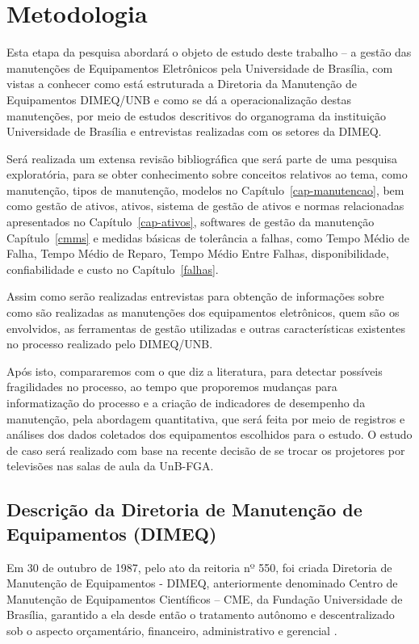 %

\chapter{Metodologia}

Esta etapa da pesquisa abordará o objeto de estudo deste trabalho – a gestão das manutenções de Equipamentos Eletrônicos pela Universidade de Brasília, com vistas a conhecer como está estruturada a Diretoria da Manutenção de Equipamentos DIMEQ/UNB e como se dá a operacionalização destas manutenções, por meio de estudos descritivos do organograma da instituição Universidade de Brasília e entrevistas realizadas com os setores da DIMEQ.

Será realizada um extensa revisão bibliográfica que será parte de uma pesquisa exploratória, para se obter conhecimento sobre conceitos relativos ao tema, como manutenção, tipos de manutenção, modelos no Capítulo~\ref{cap-manutencao}, bem como gestão de ativos, ativos, sistema de gestão de ativos e normas relacionadas apresentados no Capítulo~\ref{cap-ativos}, softwares de gestão da manutenção Capítulo~\ref{cmms} e medidas básicas de tolerância a falhas, como  Tempo Médio de Falha, Tempo Médio de Reparo, Tempo Médio Entre Falhas, disponibilidade, confiabilidade e custo no Capítulo~\ref{falhas}.

Assim como serão realizadas entrevistas para obtenção de informações sobre como são realizadas as manutenções dos equipamentos eletrônicos, quem são os envolvidos, as ferramentas de gestão utilizadas e outras características existentes no processo realizado pelo DIMEQ/UNB.

Após isto, compararemos com o que diz a literatura, para detectar possíveis fragilidades no processo, ao tempo que proporemos mudanças para informatização do processo e a criação de indicadores de desempenho da manutenção, pela abordagem quantitativa, que será feita por meio de registros e análises dos dados coletados dos equipamentos escolhidos para o estudo. O estudo de caso será realizado com base na recente decisão de se trocar os projetores por televisões nas salas de aula da UnB-FGA. 

\section{Descrição da Diretoria de Manutenção de Equipamentos (DIMEQ)}

Em 30 de outubro de 1987, pelo ato da reitoria nº 550, foi criada Diretoria de Manutenção de Equipamentos - DIMEQ, anteriormente denominado Centro de Manutenção de Equipamentos Científicos – CME, da Fundação Universidade de Brasília, garantido a ela desde então o tratamento autônomo e descentralizado sob o aspecto orçamentário, financeiro, administrativo e gerencial \cite{dimeq}.

